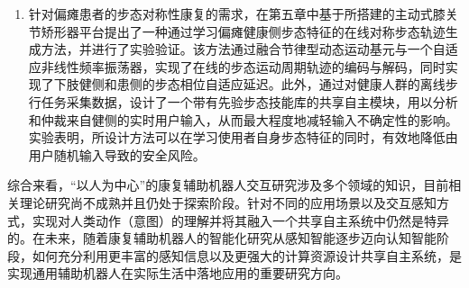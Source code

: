 \begin{enumerate}
\item 针对偏瘫患者的步态对称性康复的需求，在第五章中基于所搭建的主动式膝关节矫形器平台提出了一种通过学习偏瘫健康侧步态特征的在线对称步态轨迹生成方法，并进行了实验验证。该方法通过融合节律型动态运动基元与一个自适应非线性频率振荡器，实现了在线的步态运动周期轨迹的编码与解码，同时实现了下肢健侧和患侧的步态相位自适应延迟。此外，通过对健康人群的离线步行任务采集数据，设计了一个带有先验步态技能库的共享自主模块，用以分析和仲裁来自健侧的实时用户输入，从而最大程度地减轻输入不确定性的影响。实验表明，所设计方法可以在学习使用者自身步态特征的同时，有效地降低由用户随机输入导致的安全风险。
\end{enumerate}

综合来看，``以人为中心''的康复辅助机器人交互研究涉及多个领域的知识，目前相关理论研究尚不成熟并且仍处于探索阶段。针对不同的应用场景以及交互感知方式，实现对人类动作（意图）的理解并将其融入一个共享自主系统中仍然是特异的。在未来，随着康复辅助机器人的智能化研究从感知智能逐步迈向认知智能阶段，如何充分利用更丰富的感知信息以及更强大的计算资源设计共享自主系统，是实现通用辅助机器人在实际生活中落地应用的重要研究方向。